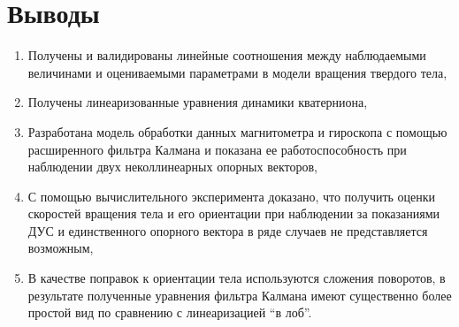 \documentclass{article}
\begin{document}
\section{Выводы}
\begin{enumerate}
    \item Получены и валидированы линейные соотношения между наблюдаемыми величинами и
        оцениваемыми параметрами в модели вращения твердого тела,
    \item Получены линеаризованные уравнения динамики кватерниона,
    \item Разработана модель обработки данных магнитометра и гироскопа с
        помощью расширенного фильтра Калмана и показана ее работоспособность
        при наблюдении двух неколлинеарных опорных векторов,
    \item С помощью вычислительного эксперимента доказано, что получить оценки
        скоростей вращения тела и его ориентации при наблюдении за показаниями
        ДУС и единственного опорного вектора в ряде случаев не представляется
        возможным,
    \item В качестве поправок к ориентации тела используются сложения
        поворотов, в результате полученные уравнения фильтра Калмана имеют существенно более
        простой вид по сравнению с линеаризацией ``в лоб''.
\end{enumerate}
\end{document}
